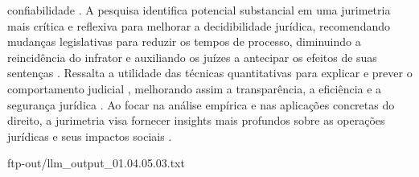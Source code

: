 confiabilidade \cite{ribeiro2021}. A pesquisa identifica potencial substancial em uma jurimetria mais crítica e reflexiva para melhorar a decidibilidade jurídica, recomendando mudanças legislativas para reduzir os tempos de processo, diminuindo a reincidência do infrator e auxiliando os juízes a antecipar os efeitos de suas sentenças \cite{nunes2018}. Ressalta a utilidade das técnicas quantitativas para explicar e prever o comportamento judicial \cite{luvizotto2020}, melhorando assim a transparência, a eficiência e a segurança jurídica \cite{silva2023}. Ao focar na análise empírica e nas aplicações concretas do direito, a jurimetria visa fornecer insights mais profundos sobre as operações jurídicas e seus impactos sociais \cite{nunes2018}. 

ftp-out/llm_output_01.04.05.03.txt 

